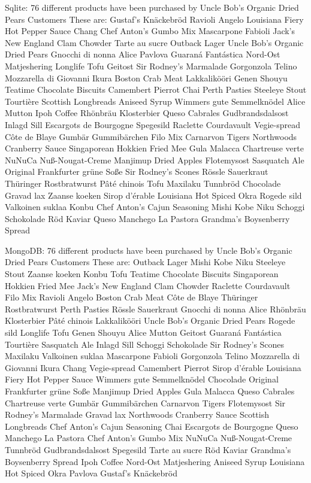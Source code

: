 \documentclass{article}
\begin{document}
\begin{pythonOutput}
Sqlite: 76 different products have been purchased by Uncle Bob's Organic Dried Pears Customers
These are:
Gustaf's Knäckebröd
Ravioli Angelo
Louisiana Fiery Hot Pepper Sauce
Chang
Chef Anton's Gumbo Mix
Mascarpone Fabioli
Jack's New England Clam Chowder
Tarte au sucre
Outback Lager
Uncle Bob's Organic Dried Pears
Gnocchi di nonna Alice
Pavlova
Guaraná Fantástica
Nord-Ost Matjeshering
Longlife Tofu
Geitost
Sir Rodney's Marmalade
Gorgonzola Telino
Mozzarella di Giovanni
Ikura
Boston Crab Meat
Lakkalikööri
Genen Shouyu
Teatime Chocolate Biscuits
Camembert Pierrot
Chai
Perth Pasties
Steeleye Stout
Tourtière
Scottish Longbreads
Aniseed Syrup
Wimmers gute Semmelknödel
Alice Mutton
Ipoh Coffee
Rhönbräu Klosterbier
Queso Cabrales
Gudbrandsdalsost
Inlagd Sill
Escargots de Bourgogne
Spegesild
Raclette Courdavault
Vegie-spread
Côte de Blaye
Gumbär Gummibärchen
Filo Mix
Carnarvon Tigers
Northwoods Cranberry Sauce
Singaporean Hokkien Fried Mee
Gula Malacca
Chartreuse verte
NuNuCa Nuß-Nougat-Creme
Manjimup Dried Apples
Flotemysost
Sasquatch Ale
Original Frankfurter grüne Soße
Sir Rodney's Scones
Rössle Sauerkraut
Thüringer Rostbratwurst
Pâté chinois
Tofu
Maxilaku
Tunnbröd
Chocolade
Gravad lax
Zaanse koeken
Sirop d'érable
Louisiana Hot Spiced Okra
Rogede sild
Valkoinen suklaa
Konbu
Chef Anton's Cajun Seasoning
Mishi Kobe Niku
Schoggi Schokolade
Röd Kaviar
Queso Manchego La Pastora
Grandma's Boysenberry Spread


MongoDB: 76 different products have been purchased by Uncle Bob's Organic Dried Pears Customers
These are:
Outback Lager
Mishi Kobe Niku
Steeleye Stout
Zaanse koeken
Konbu
Tofu
Teatime Chocolate Biscuits
Singaporean Hokkien Fried Mee
Jack's New England Clam Chowder
Raclette Courdavault
Filo Mix
Ravioli Angelo
Boston Crab Meat
Côte de Blaye
Thüringer Rostbratwurst
Perth Pasties
Rössle Sauerkraut
Gnocchi di nonna Alice
Rhönbräu Klosterbier
Pâté chinois
Lakkalikööri
Uncle Bob's Organic Dried Pears
Rogede sild
Longlife Tofu
Genen Shouyu
Alice Mutton
Geitost
Guaraná Fantástica
Tourtière
Sasquatch Ale
Inlagd Sill
Schoggi Schokolade
Sir Rodney's Scones
Maxilaku
Valkoinen suklaa
Mascarpone Fabioli
Gorgonzola Telino
Mozzarella di Giovanni
Ikura
Chang
Vegie-spread
Camembert Pierrot
Sirop d'érable
Louisiana Fiery Hot Pepper Sauce
Wimmers gute Semmelknödel
Chocolade
Original Frankfurter grüne Soße
Manjimup Dried Apples
Gula Malacca
Queso Cabrales
Chartreuse verte
Gumbär Gummibärchen
Carnarvon Tigers
Flotemysost
Sir Rodney's Marmalade
Gravad lax
Northwoods Cranberry Sauce
Scottish Longbreads
Chef Anton's Cajun Seasoning
Chai
Escargots de Bourgogne
Queso Manchego La Pastora
Chef Anton's Gumbo Mix
NuNuCa Nuß-Nougat-Creme
Tunnbröd
Gudbrandsdalsost
Spegesild
Tarte au sucre
Röd Kaviar
Grandma's Boysenberry Spread
Ipoh Coffee
Nord-Ost Matjeshering
Aniseed Syrup
Louisiana Hot Spiced Okra
Pavlova
Gustaf's Knäckebröd
\end{pythonOutput}
\end{document}
